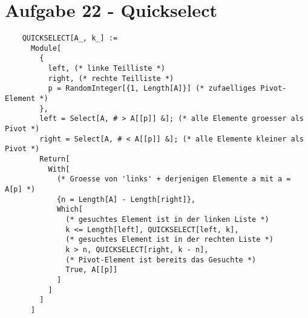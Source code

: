 \section*{Aufgabe 22 - Quickselect}
  \newcommand{\meanv}{\overline{v}}
  \lstset{ %
    language=Mathematica,
    basicstyle=\small,
    numbers=left,
    numberstyle=\small,
    numbersep=-9pt
  }
  \begin{lstlisting}
    QUICKSELECT[A_, k_] :=
      Module[
        {
          left, (* linke Teilliste *)
          right, (* rechte Teilliste *)
          p = RandomInteger[{1, Length[A]}] (* zufaelliges Pivot-Element *)
        },
        left = Select[A, # > A[[p]] &]; (* alle Elemente groesser als Pivot *)
        right = Select[A, # < A[[p]] &]; (* alle Elemente kleiner als Pivot *)
        Return[
          With[
            (* Groesse von 'links' + derjenigen Elemente a mit a = A[p] *)
            {n = Length[A] - Length[right]},
            Which[
              (* gesuchtes Element ist in der linken Liste *)
              k <= Length[left], QUICKSELECT[left, k],
              (* gesuchtes Element ist in der rechten Liste *)
              k > n, QUICKSELECT[right, k - n],
              (* Pivot-Element ist bereits das Gesuchte *)
              True, A[[p]]
            ]
          ]
        ]
      ]
  \end{lstlisting}
